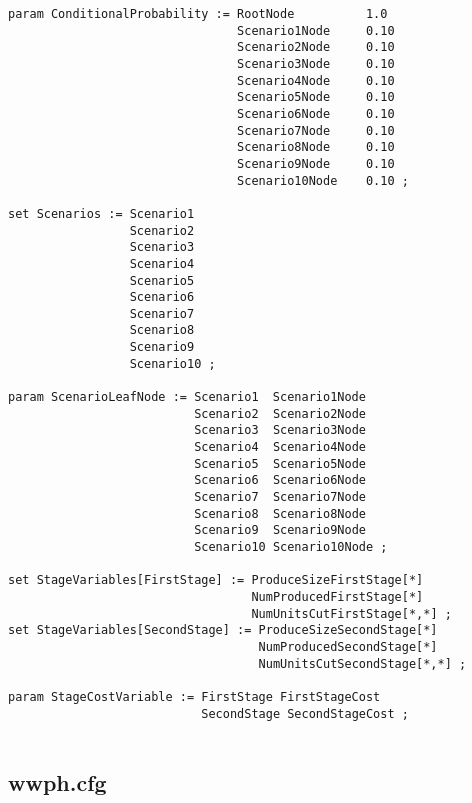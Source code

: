 {\begin{verbatim}
param ConditionalProbability := RootNode          1.0
                                Scenario1Node     0.10
                                Scenario2Node     0.10
                                Scenario3Node     0.10
                                Scenario4Node     0.10
                                Scenario5Node     0.10
                                Scenario6Node     0.10
                                Scenario7Node     0.10
                                Scenario8Node     0.10
                                Scenario9Node     0.10
                                Scenario10Node    0.10 ;

set Scenarios := Scenario1 
                 Scenario2 
                 Scenario3 
                 Scenario4 
                 Scenario5 
                 Scenario6 
                 Scenario7 
                 Scenario8 
                 Scenario9 
                 Scenario10 ; 

param ScenarioLeafNode := Scenario1  Scenario1Node  
                          Scenario2  Scenario2Node  
                          Scenario3  Scenario3Node  
                          Scenario4  Scenario4Node  
                          Scenario5  Scenario5Node  
                          Scenario6  Scenario6Node  
                          Scenario7  Scenario7Node  
                          Scenario8  Scenario8Node  
                          Scenario9  Scenario9Node  
                          Scenario10 Scenario10Node ;

set StageVariables[FirstStage] := ProduceSizeFirstStage[*]
                                  NumProducedFirstStage[*]
                                  NumUnitsCutFirstStage[*,*] ;
set StageVariables[SecondStage] := ProduceSizeSecondStage[*]
                                   NumProducedSecondStage[*]
                                   NumUnitsCutSecondStage[*,*] ;

param StageCostVariable := FirstStage FirstStageCost
                           SecondStage SecondStageCost ;
                                   
\end{verbatim}
}

\subsection{wwph.cfg}

